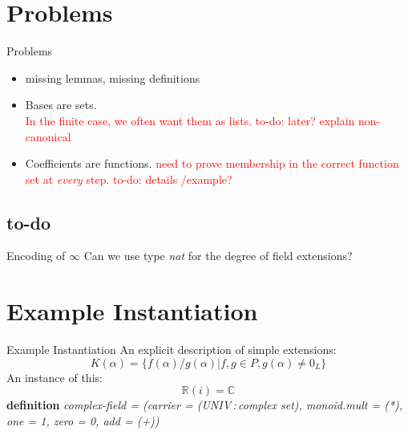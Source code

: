 \documentclass[%
	sans,
	12pt,
]{beamer}
\newcommand{\bad}[1]{\textcolor{red}{#1}}
\newcommand{\RR}{\mathbb{R}}
\newcommand{\CC}{\mathbb{C}}
\newcommand{\hastype}{\,:\,}
\begin{document}
\section{Problems}
\begin{frame}{Problems}
\begin{itemize}
	\item missing lemmas, missing definitions\pause %
	\item Bases are sets.\\\pause
	\bad{In the finite case, we often want them as lists. to-do: later? explain non-canonical}
	\item Coefficients are functions.
	\bad{need to prove membership in the correct function set at \emph{every} step.
		to-do: details /example?}
\end{itemize}
\end{frame}

\subsection{to-do}
\begin{frame}{Encoding of $\infty$}%
Can we use type \emph{nat} for the degree of field extensions?\pause
{}
\end{frame}

\section{Example Instantiation}

\begin{frame}{Example Instantiation}%
An explicit description of simple extensions: %
\[K(\alpha) = \{f(\alpha)/g(\alpha) | f,g \in P, g(\alpha) ≠ \textbf{$0_L$}\}\]\pause
An instance of this:\\
\[\RR(i) = \CC\]\pause
\textbf{definition} \textit{complex-field = (carrier = (UNIV\hastype complex set), monoid.mult = (*), one = 1, zero = 0, add = (+))}
\end{frame}
\end{document}
